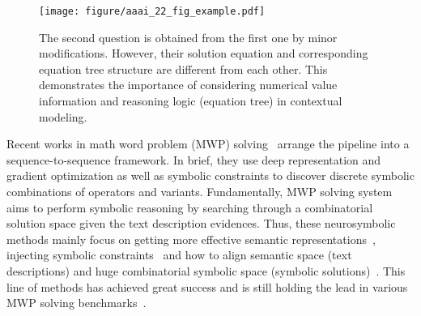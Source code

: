 \documentclass[11pt]{article}
\begin{document}
\begin{figure}[t!]
\centering 
\texttt{[image: figure/aaai\_22\_fig\_example.pdf]}
\caption{The second question is obtained from the first one by minor modifications. However, their solution equation and corresponding equation tree structure are different from each other. This demonstrates the importance
of considering numerical value information and reasoning logic (equation tree) in contextual modeling.}\label{fig:intro} 
\end{figure} Recent works in math word problem (MWP) solving~\cite{wang2018translating,wang2019template,liu2019tree,li2019modeling,xie2019goal,zhang2020graph,wu2020knowledge,qin2021neural,huang2021recall,wu2021edge,yu2021improving,DBLP:conf/emnlp/ShenYLSJ0021} arrange  the  pipeline into a sequence-to-sequence framework. In brief, they use deep representation and gradient optimization as well as symbolic constraints to discover discrete symbolic combinations of operators and variants. Fundamentally, MWP solving system aims to perform symbolic reasoning by searching through a combinatorial solution space given the text description evidences. Thus, 
these neurosymbolic methods mainly focus on getting more effective semantic representations~\cite{li2019modeling,zhang2020graph,wu2020knowledge,wu2021edge,yu2021improving}, injecting symbolic constraints~\cite{wang2018translating,wang2019template,liu2019tree,xie2019goal} and how to align semantic space (text descriptions) and huge combinatorial symbolic space (symbolic solutions)~\cite{qin2021neural,DBLP:conf/emnlp/ShenYLSJ0021,huang2021recall}. This line of methods has achieved great success and is still holding the lead in various MWP solving benchmarks~\cite{wang2017deep,zhao2020ape210k,koncel2016mawps}. 
\end{document}
